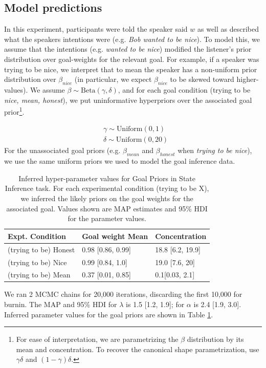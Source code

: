 \documentclass[10pt,letterpaper]{article}
\newcommand{\red}[1]{\textcolor{Red}{#1}}
\begin{document}
\subsection{Model predictions}

In this experiment, participants were told the speaker said $w$ as well as described what the speakers intentions were (e.g. \emph{Bob wanted to be nice}). 
To model this, we assume that the intentions (e.g. \emph{wanted to be nice}) modified the listener's prior distribution over goal-weights for the relevant goal. For example, if a speaker was trying to be nice, we interpret that to mean the speaker has a non-uniform prior distribution over $\beta_{nice}$ (in particular, we expect $\beta_{nice}$ to be skewed toward higher-values). 
We assume $\beta \sim \text{Beta}(\gamma, \delta)$, and for each goal condition (trying to be \emph{nice, mean, honest}), we put uninformative hyperpriors over the associated goal prior\footnote{For ease of interpretation, we are parametrizing the $\beta$ distribution by its mean and concentration. To recover the canonical shape parametrization, use $\gamma \delta$ and $(1-\gamma)\delta$.}.

%
\begin{eqnarray*}
& \gamma \sim  \text{Uniform}(0,1)\\
& \delta  \sim  \text{Uniform}(0, 20)
\end{eqnarray*}
For the unassociated goal priors (e.g. $\beta_{mean}$ and $\beta_{honest}$ when \emph{trying to be nice}), we use the same uniform priors we used to model the goal inference data.

\begin{table}[]
\centering
\begin{tabular}{lll}
\hline
Expt. Condition  & Goal weight Mean & Concentration \\ \hline
(trying to be) Honest                        &   0.98 [0.86, 0.99]   & 18.8 [6.2, 19.9] \\
(trying to be) Nice                          & 0.99 [0.84, 1.0] & 19.0 [7.6, 20] \\
(trying to be) Mean                          &0.37 [0.01, 0.85] & 0.1[0.03, 2.1] \\ \hline
\end{tabular}
\caption{\label{tab:params} Inferred hyper-parameter values for Goal Priors in State Inference task.
For each experimental condition (trying to be X), we inferred the likely priors on the goal weights for the associated goal.
Values shown are MAP estimates and 95\% HDI for the parameter values.}
\end{table}
We ran 2 MCMC chains for 20,000 iterations, discarding the first 10,000 for burnin.
The MAP and 95\% HDI for $\lambda$ is 1.5 [1.2, 1.9]; for $\alpha$ is 2.4 [1.9, 3.0]. %
Inferred parameter values for the goal priors are shown in Table \ref{tab:params}.
\end{document}
